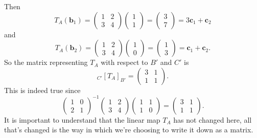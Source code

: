 \documentclass[12pt]{report}
\theoremstyle{definition}
\begin{document}
\begin{ex}
\[    \]Then\[
    T_A(\mathbf{b}_1) = \begin{pmatrix}
        1 & 2 \\
        3 & 4
    \end{pmatrix} \begin{pmatrix}
            1 \\
            1
    \end{pmatrix} = \begin{pmatrix}
            3 \\
            7
    \end{pmatrix} = 3\mathbf{c}_1 + \mathbf{c}_2
    \]and\[
    T_A(\mathbf{b}_2) = \begin{pmatrix}
        1 & 2 \\
        3 & 4
    \end{pmatrix} \begin{pmatrix}
            1 \\
            0
    \end{pmatrix} = \begin{pmatrix}
            1 \\
            3
    \end{pmatrix} = \mathbf{c}_1 + \mathbf{c}_2.
    \]
    So the matrix representing $T_A$ with respect to $B'$ and $C'$ is\[
        {}_{C'}{[T_A]}_{B'} = \begin{pmatrix}
            3 & 1 \\
            1 & 1
        \end{pmatrix}.
    \]
    This is indeed true since\[
        \begin{pmatrix}
            1 & 0 \\
            2 & 1
        \end{pmatrix}^{-1} \begin{pmatrix}
            1 & 2 \\
            3 & 4
        \end{pmatrix} \begin{pmatrix}
            1 & 1 \\
            1 & 0
        \end{pmatrix} = \begin{pmatrix}
            3 & 1 \\
            1 & 1
        \end{pmatrix}.
    \]
    It is important to understand that the linear map $T_A$ has not changed
    here, all that's changed is the way in which we're choosing to write it down
    as a matrix.
\end{ex} 
\end{document}
